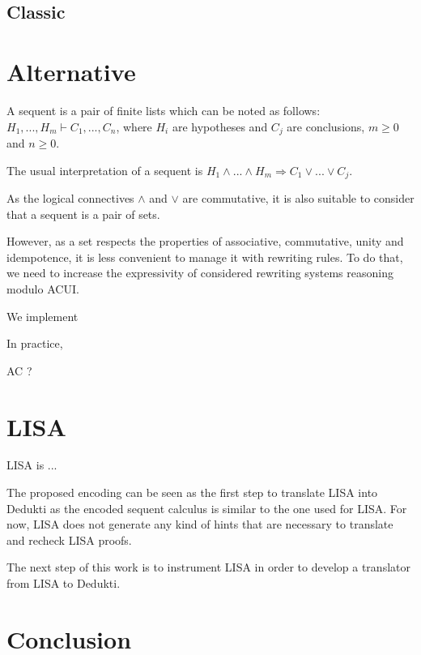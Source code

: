 \documentclass{article}
\begin{document}
	\subsection{Classic}
	
	
	\section{Alternative}
	
	A sequent is a pair of finite lists which can be noted as follows: $H_1,...,H_m \vdash C_1,...,C_n$, where $H_i$ are hypotheses and $C_j$ are conclusions, $m \ge 0$ and $n \ge 0$.
	
	The usual interpretation of a sequent is
	$H_1 \land ... \land H_m \Rightarrow C_1 \lor ... \lor C_j$.
	
	As the logical connectives $\land$ and $\lor$ are commutative, it is also suitable to consider that a sequent is a pair of sets.
	
	However, as a set respects the properties of associative, commutative, unity and idempotence, it is less convenient to manage it with rewriting rules.
	To do that, we need to increase the expressivity of considered rewriting systems reasoning modulo ACUI.
	
	We implement 
	
	In practice, 
	
	AC ?
	
	\section{LISA}
	
	LISA is ...
	
	The proposed encoding can be seen as the first step to translate LISA into Dedukti as the encoded sequent calculus is similar to the one used for LISA.
	For now, LISA does not generate any kind of hints that are necessary to translate and recheck LISA proofs.
	
	The next step of this work is to instrument LISA in order to develop a translator from LISA to Dedukti.
	
	
	
	\section{Conclusion}
	
\end{document}
